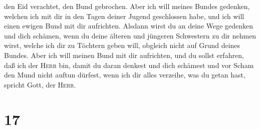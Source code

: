 den Eid verachtet, den Bund gebrochen.  Aber ich will
meines Bundes gedenken, welchen ich mit dir in den Tagen deiner Jugend
geschlossen habe, und ich will einen ewigen Bund mit dir aufrichten.
 Alsdann wirst du an deine Wege gedenken und dich
schämen, wenn du deine älteren und jüngeren Schwestern zu dir nehmen
wirst, welche ich dir zu Töchtern geben will, obgleich nicht auf Grund
deines Bundes.  Aber ich will meinen Bund mit dir
aufrichten, und du sollst erfahren, daß ich der \textsc{Herr} bin,
 damit du daran denkest und dich schämest und vor Scham
den Mund nicht auftun dürfest, wenn ich dir alles verzeihe, was du getan
hast, spricht Gott, der \textsc{Herr}.

\hypertarget{section-16}{%
\section{17}\label{section-16}}

